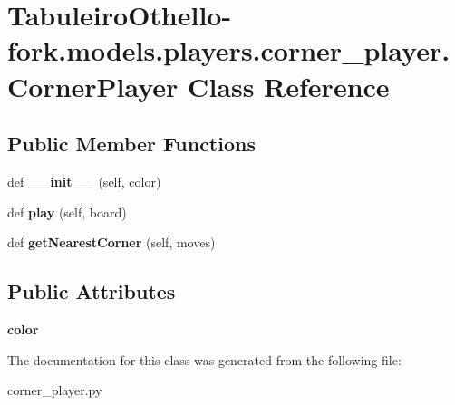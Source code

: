 \hypertarget{class_tabuleiro_othello-fork_1_1models_1_1players_1_1corner__player_1_1_corner_player}{}\section{Tabuleiro\+Othello-\/fork.models.\+players.\+corner\+\_\+player.\+Corner\+Player Class Reference}
\label{class_tabuleiro_othello-fork_1_1models_1_1players_1_1corner__player_1_1_corner_player}
\subsection*{Public Member Functions}
\begin{DoxyCompactItemize}
\item 
\hypertarget{class_tabuleiro_othello-fork_1_1models_1_1players_1_1corner__player_1_1_corner_player_a4ea38100808df8a92727ff8e19449523}{}def {\bfseries \+\_\+\+\_\+init\+\_\+\+\_\+} (self, color)\label{class_tabuleiro_othello-fork_1_1models_1_1players_1_1corner__player_1_1_corner_player_a4ea38100808df8a92727ff8e19449523}

\item 
\hypertarget{class_tabuleiro_othello-fork_1_1models_1_1players_1_1corner__player_1_1_corner_player_ae2a5fafa38f2e5ff78513041de677c8a}{}def {\bfseries play} (self, board)\label{class_tabuleiro_othello-fork_1_1models_1_1players_1_1corner__player_1_1_corner_player_ae2a5fafa38f2e5ff78513041de677c8a}

\item 
\hypertarget{class_tabuleiro_othello-fork_1_1models_1_1players_1_1corner__player_1_1_corner_player_a2cfc7e0871e38df3d5405776bd33625a}{}def {\bfseries get\+Nearest\+Corner} (self, moves)\label{class_tabuleiro_othello-fork_1_1models_1_1players_1_1corner__player_1_1_corner_player_a2cfc7e0871e38df3d5405776bd33625a}

\end{DoxyCompactItemize}
\subsection*{Public Attributes}
\begin{DoxyCompactItemize}
\item 
\hypertarget{class_tabuleiro_othello-fork_1_1models_1_1players_1_1corner__player_1_1_corner_player_a2bb48d79b041a4a8ae13159c549213c6}{}{\bfseries color}\label{class_tabuleiro_othello-fork_1_1models_1_1players_1_1corner__player_1_1_corner_player_a2bb48d79b041a4a8ae13159c549213c6}

\end{DoxyCompactItemize}


The documentation for this class was generated from the following file\+:\begin{DoxyCompactItemize}
\item 
corner\+\_\+player.\+py\end{DoxyCompactItemize}
